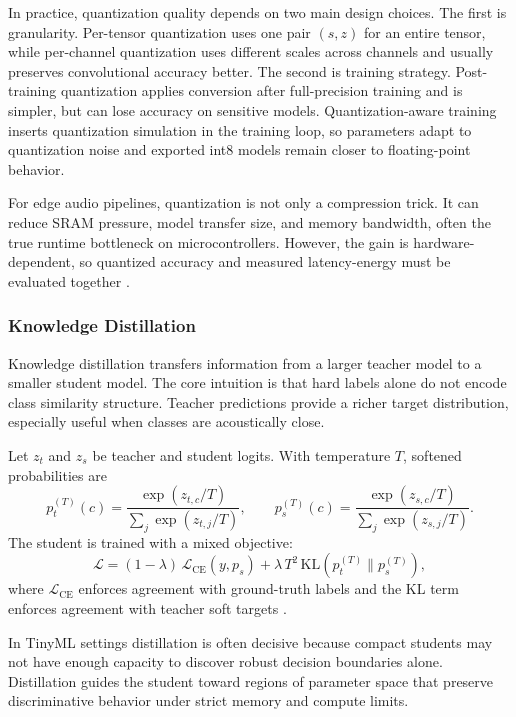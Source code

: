 \documentclass[a4paper,singleside,12pt]{report} %
\begin{document}
	In practice, quantization quality depends on two main design choices. The first is granularity. Per-tensor quantization uses one pair \((s,z)\) for an entire tensor, while per-channel quantization uses different scales across channels and usually preserves convolutional accuracy better. The second is training strategy. Post-training quantization applies conversion after full-precision training and is simpler, but can lose accuracy on sensitive models. Quantization-aware training inserts quantization simulation in the training loop, so parameters adapt to quantization noise and exported int8 models remain closer to floating-point behavior.

	For edge audio pipelines, quantization is not only a compression trick. It can reduce SRAM pressure, model transfer size, and memory bandwidth, often the true runtime bottleneck on microcontrollers. However, the gain is hardware-dependent, so quantized accuracy and measured latency-energy must be evaluated together \cite{tao2022energy}.
	\subsubsection{Knowledge Distillation}
	Knowledge distillation transfers information from a larger teacher model to a smaller student model. The core intuition is that hard labels alone do not encode class similarity structure. Teacher predictions provide a richer target distribution, especially useful when classes are acoustically close.

	Let \(z_t\) and \(z_s\) be teacher and student logits. With temperature \(T\), softened probabilities are
	\begin{equation}
		p_t^{(T)}(c)=\frac{\exp(z_{t,c}/T)}{\sum_j\exp(z_{t,j}/T)},\qquad
		p_s^{(T)}(c)=\frac{\exp(z_{s,c}/T)}{\sum_j\exp(z_{s,j}/T)}.
	\end{equation}
	The student is trained with a mixed objective:
	\begin{equation}
		\mathcal{L}=(1-\lambda)\,\mathcal{L}_{\mathrm{CE}}(y,p_s)+\lambda\,T^2\,\mathrm{KL}\!\left(p_t^{(T)}\|p_s^{(T)}\right),
	\end{equation}
	where \(\mathcal{L}_{\mathrm{CE}}\) enforces agreement with ground-truth labels and the KL term enforces agreement with teacher soft targets \cite{hinton2015distilling}.

	In TinyML settings distillation is often decisive because compact students may not have enough capacity to discover robust decision boundaries alone. Distillation guides the student toward regions of parameter space that preserve discriminative behavior under strict memory and compute limits.
\end{document}
